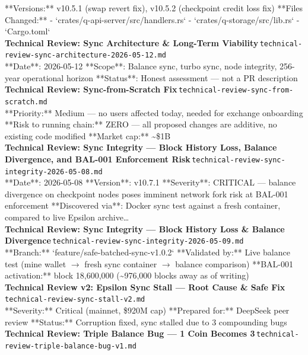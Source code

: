 \documentclass[11pt,a4paper]{article}
\begin{document}
**Versions:** v10.5.1 (swap revert fix), v10.5.2 (checkpoint credit loss fix) **Files Changed:** - `crates/q-api-server/src/handlers.rs` - `crates/q-storage/src/lib.rs` - `Cargo.toml`\\[6pt]
\noindent\textbf{Technical Review: Sync Architecture \& Long-Term Viability}\,\textcolor{qgray}{\small \texttt{technical-review-sync-architecture-2026-05-12.md}}\\
**Date**: 2026-05-12 **Scope**: Balance sync, turbo sync, node integrity, 256-year operational horizon **Status**: Honest assessment --- not a PR description\\[6pt]
\noindent\textbf{Technical Review: Sync-from-Scratch Fix}\,\textcolor{qgray}{\small \texttt{technical-review-sync-from-scratch.md}}\\
**Priority:** Medium --- no users affected today, needed for exchange onboarding **Risk to running chain:** ZERO --- all proposed changes are additive, no existing code modified **Market cap:** \textasciitilde{}\$1B\\[6pt]
\noindent\textbf{Technical Review: Sync Integrity --- Block History Loss, Balance Divergence, and BAL-001 Enforcement Risk}\,\textcolor{qgray}{\small \texttt{technical-review-sync-integrity-2026-05-08.md}}\\
**Date**: 2026-05-08 **Version**: v10.7.1 **Severity**: CRITICAL --- balance divergence on checkpoint nodes poses imminent network fork risk at BAL-001 enforcement **Discovered via**: Docker sync test against a fresh container, compared to live Epsilon archive\ldots{}\\[6pt]
\noindent\textbf{Technical Review: Sync Integrity --- Block History Loss \& Balance Divergence}\,\textcolor{qgray}{\small \texttt{technical-review-sync-integrity-2026-05-09.md}}\\
**Branch:** `feature/safe-batched-sync-v1.0.2` **Validated by:** Live balance test (mine wallet $\rightarrow$ fresh sync container $\rightarrow$ balance comparison) **BAL-001 activation:** block 18,600,000 (\textasciitilde{}976,000 blocks away as of writing)\\[6pt]
\noindent\textbf{Technical Review v2: Epsilon Sync Stall --- Root Cause \& Safe Fix}\,\textcolor{qgray}{\small \texttt{technical-review-sync-stall-v2.md}}\\
**Severity:** Critical (mainnet, \$920M cap) **Prepared for:** DeepSeek peer review **Status:** Corruption fixed, sync stalled due to 3 compounding bugs\\[6pt]
\noindent\textbf{Technical Review: Triple Balance Bug --- 1 Coin Becomes 3}\,\textcolor{qgray}{\small \texttt{technical-review-triple-balance-bug-v1.md}}\\
\end{document}
